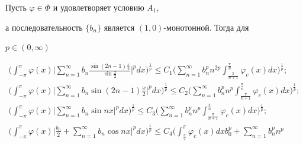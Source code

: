 \begin{lem}


Пусть $\varphi \in \Phi$ и удовлетворяет условию $A_1$,


а последовательность $\{b_n\}$ является $(1,0)$-монотонной. Тогда для


$p\in(0,\infty)$


\begin{gather}


\bigg(\int_{-\pi}^{\pi} \varphi(x) \bigg| \sum\limits_{n=1}^{\infty}


b_n \frac{\sin(2n-1)\frac{x}{2} }{\sin{\frac{x}{2}}}\bigg|^p dx 


\bigg)^{\frac{1}{p}}\leq 


C_1\bigg( \sum\limits_{n=1}^{\infty} b_n^p n^{2p}


\int_{\frac{\pi}{n+1}}^{\frac{\pi}{n}}


\varphi_c(x) dx \bigg)^{\frac{1}{p}};\\


%


\bigg(\int_{-\pi}^{\pi}\varphi(x)\bigg|\sum\limits_{n=1}^{\infty}


b_n\sin(2n-1)\frac{x}{2} \bigg|^p dx \bigg)^{\frac{1}{p}}\leq


C_2\bigg(\sum\limits_{n=1}^{\infty}b_n^p n^p 


\int_{\frac{\pi}{n+1}}^{\frac{\pi}{n}}


\varphi_c(x) dx \bigg)^{\frac{1}{p}}; \\


%


\bigg(\int_{-\pi}^{\pi}\varphi(x)\bigg|\sum\limits_{n=1}^{\infty}


b_n \sin nx\bigg|^p dx \bigg)^{\frac{1}{p}} \leq


C_3\bigg(\sum\limits_{n=1}^{\infty}


b_n^p n^p\int_{\frac{\pi}{n+1}}^{\frac{\pi}{n}}


\varphi_c(x)dx \bigg)^{\frac{1}{p}}; \\


%


\bigg( \int_{-\pi}^{\pi} \varphi (x) 


\bigg|\frac{b_0}{2}+\sum\limits_{n=1}^{\infty}


b_n \cos nx\bigg|^pdx \bigg)^{\frac{1}{p}} \leq


C_4\bigg(\int_{\frac{\pi}{2}}^{\pi}\varphi_c(x) dx b_0^p +


\sum\limits_{n=1}^{\infty} b_n^p n^p 



\end{gather}
\end{lem}
